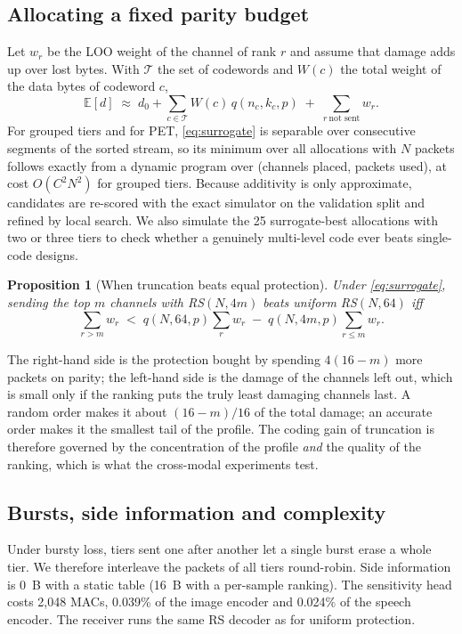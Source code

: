 \documentclass[journal]{IEEEtran}
\newtheorem{proposition}{Proposition}
\begin{document}
\subsection{Allocating a fixed parity budget}
Let $w_r$ be the LOO weight of the channel of rank $r$ and assume that damage adds up over lost bytes.
With $\mathcal{T}$ the set of codewords and $W(c)$ the total weight of the data bytes of codeword $c$,
\begin{equation}
\mathbb{E}[d] \;\approx\; d_0 + \sum_{c\in\mathcal{T}} W(c)\, q(n_c,k_c,p)
\;+\; \sum_{r\ \text{not sent}} w_r . \label{eq:surrogate}
\end{equation}
For grouped tiers and for PET, \eqref{eq:surrogate} is separable over consecutive segments of the sorted
stream, so its minimum over all allocations with $N$ packets follows exactly from a dynamic program over
(channels placed, packets used), at cost $O(C^2N^2)$ for grouped tiers. Because additivity is only
approximate, candidates are re-scored with the exact simulator on the validation split and refined by
local search. We also simulate the 25 surrogate-best allocations with two or three tiers to check whether
a genuinely multi-level code ever beats single-code designs.

\begin{proposition}[When truncation beats equal protection]\label{prop:trunc}
Under \eqref{eq:surrogate}, sending the top $m$ channels with RS$(N,4m)$ beats uniform RS$(N,64)$ iff
\begin{equation}
\textstyle\sum_{r>m} w_r \;<\; q(N,64,p)\sum_{r} w_r \;-\; q(N,4m,p)\sum_{r\le m} w_r .
\end{equation}
\end{proposition}
The right-hand side is the protection bought by spending $4(16-m)$ more packets on parity; the left-hand
side is the damage of the channels left out, which is small only if the ranking puts the truly least
damaging channels last. A random order makes it about $(16-m)/16$ of the total damage; an accurate order
makes it the smallest tail of the profile. The coding gain of truncation is therefore governed by the
concentration of the profile \emph{and} the quality of the ranking, which is what the cross-modal
experiments test.

\subsection{Bursts, side information and complexity}
Under bursty loss, tiers sent one after another let a single burst erase a whole tier. We therefore
interleave the packets of all tiers round-robin. Side information is 0~B with a static table (16~B with a
per-sample ranking). The sensitivity head costs 2,048 MACs, 0.039\% of the image encoder and 0.024\% of
the speech encoder. The receiver runs the same RS decoder as for uniform protection.
\end{document}

